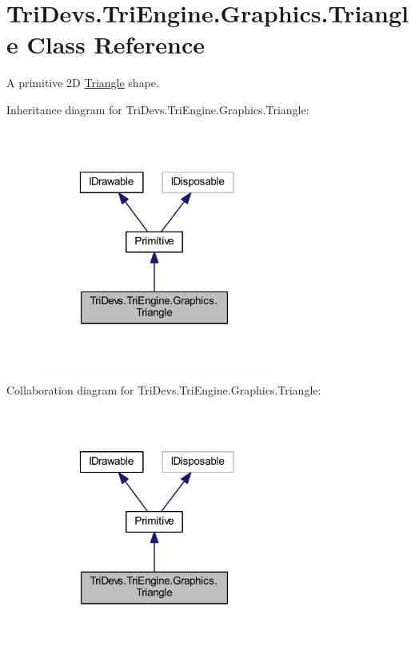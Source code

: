 \hypertarget{class_tri_devs_1_1_tri_engine_1_1_graphics_1_1_triangle}{\section{Tri\-Devs.\-Tri\-Engine.\-Graphics.\-Triangle Class Reference}
\label{class_tri_devs_1_1_tri_engine_1_1_graphics_1_1_triangle}
}


A primitive 2\-D \hyperlink{class_tri_devs_1_1_tri_engine_1_1_graphics_1_1_triangle}{Triangle} shape.  




Inheritance diagram for Tri\-Devs.\-Tri\-Engine.\-Graphics.\-Triangle\-:
\nopagebreak
\begin{figure}[H]
\begin{center}
\leavevmode
\includegraphics[width=223pt]{class_tri_devs_1_1_tri_engine_1_1_graphics_1_1_triangle__inherit__graph}
\end{center}
\end{figure}


Collaboration diagram for Tri\-Devs.\-Tri\-Engine.\-Graphics.\-Triangle\-:
\nopagebreak
\begin{figure}[H]
\begin{center}
\leavevmode
\includegraphics[width=223pt]{class_tri_devs_1_1_tri_engine_1_1_graphics_1_1_triangle__coll__graph}
\end{center}
\end{figure}
